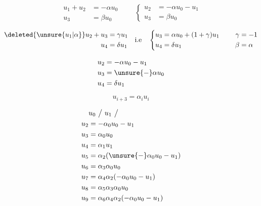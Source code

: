 
\[
\begin{aligned}u_1+u_2&=-\alpha u_0\\u_3&=\beta u_0\end{aligned}
\qquad\left\{\begin{aligned}u_2&=-\alpha u_0-u_1\\u_3&=\beta u_0\end{aligned}\right.
\]

\[
\begin{aligned}\deleted{\unsure{u_1|\alpha}}u_2+u_3&=\gamma u_1\\u_4&=\delta u_1\end{aligned}
\quad\text{i.e}\quad
\left\{\begin{aligned}u_3&=\alpha u_0+(1+\gamma)u_1\\u_4&=\delta u_1\end{aligned}\right.
\qquad\begin{aligned}\gamma&=-1\\\beta&=\alpha\end{aligned}
\]


\[
\begin{aligned}
u_2&=-\alpha u_0-u_1\\u_3&=\unsure{-}\alpha u_0\\u_4&=\delta u_1
\end{aligned}
\]

\[
u_{i+3}=\alpha_i u_i
\]


\[
\begin{aligned}
&u_0\ \big/\ u_1\ \big/\\
u_2&=-\alpha_0u_0-u_1\\
u_3&=\alpha_0u_0\\
u_4&=\alpha_1u_1\\
u_5&=\alpha_2(\unsure{-}\alpha_0u_0-u_1)\\
u_6&=\alpha_3\alpha_0u_0\\
u_7&=\alpha_4\alpha_2(-\alpha_0u_0-u_1)\\
u_8&=\alpha_5\alpha_3\alpha_0u_0\\
u_9&=\alpha_6\alpha_4\alpha_2(-\alpha_0u_0-u_1)
\end{aligned}
\]

